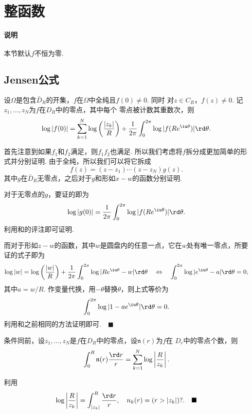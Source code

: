\section{整函数}
  \paragraph{说明}
    本节默认$f$不恒为零.

\subsection{Jensen公式}

  \begin{thm}[Jensen]
    \label{thm: Jensen}
    设$\Omega$是包含$\bar{D}_R$的开集，$f$在$\Omega$中全纯且$f(0)\ne 0$. 同时
    对$z\in C_R$，$f(z)\ne 0$. 记$z_1,\dots,z_N$为$f$在$D_R$中的零点，其中每个
    零点被计数其重数次，则
    \begin{equation}
      \label{equ: Jensen}
      \log|f(0)| = \sum_{k=1}^N\log\left( \frac{|z_k|}{R} \right)
      + \frac{1}{2\pi}\int_0^{2\pi}\log|f(Re^{\iu\theta})|\rd\theta.
    \end{equation}
  \end{thm}
  \remark
  \proof
    首先注意到如果$f_1$和$f_2$满足，则$f_1f_2$也满足.
    所以我们考虑将$f$拆分成更加简单的形式并分别证明. 由于全纯，所以我们可以将它拆成
    \[
      f(z) = (z-z_1)\cdots (z-z_N)g(z).
    \]
    其中$g$在$\bar{D}_R$无零点，之后对于$g$和形如$x-w$的函数分别证明.\par
    对于无零点的$g$，要证的即为
    \[
      \log|g(0)| = \frac{1}{2\pi}\int_0^{2\pi}\log|f(Re^{\iu\theta})|\rd\theta.
    \]
    利用和的评注即可证明.\par
    而对于形如$z-w$的函数，其中$w$是圆盘内的任意一点，它在$w$处有唯一零点，所要证的式子即为
    \[
      \log|w|=\log\left( \frac{|w|}{R} \right) + \frac{1}{2\pi}\int_0^{2\pi}
      \log|Re^{\iu\theta} - w|\rd\theta \quad\Leftrightarrow\quad
      \int_0^{2\pi}\log|e^{\iu\theta}-a|\rd\theta = 0,
    \]
    其中$a=w/R$. 作变量代换，用$-\theta$替换$\theta$，则上式等价为
    \[
      \int_0^{2\pi}\log|1-ae^{\iu\theta}|\rd\theta = 0.
    \]
    利用和之前相同的方法证明即可.$\quad\blacksquare$

  \begin{lemma}
    条件同前，设$z_1,\dots,z_N$是$f$在$D_R$中的零点，设$\mathfrak{n}(r)$为$f$在
    $D_r$中的零点个数，则
    \[
      \int_0^R \mathfrak{n}(r)\frac{\rd r}{r} = 
      \sum_{k=1}^N\log\left| \frac{R}{z_k} \right|.
    \]
  \end{lemma}
  \proof
    利用
    \[
      \log\left| \frac{R}{z_k} \right|=\int_{|z_k|}^R\frac{\rd r}{r},
      \quad n_k(r) = ( r > |z_k| )?.\quad\blacksquare
    \]

